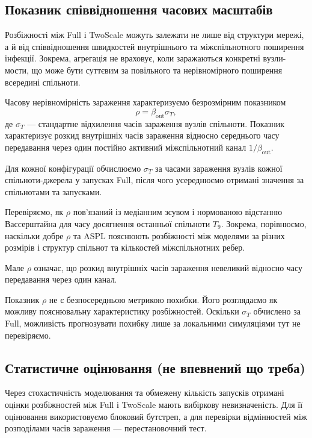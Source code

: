 \documentclass[a4paper,fleqn]{cas-sc}
\begin{document}
\subsection{Показник співвідношення часових масштабів}
\label{sec:descriptor}

Розбіжності між Full і TwoScale можуть залежати
не лише від структури мережі, а й від співвідношення
швидкостей внутрішнього та міжспільнотного
поширення інфекції. Зокрема, агрегація
не враховує, коли заражаються конкретні
вузли-мости, що може бути суттєвим
за повільного та нерівномірного
поширення всередині спільноти.

Часову нерівномірність зараження характеризуємо
безрозмірним показником
\begin{equation}
\label{eq:rho}
\rho=\beta_{\mathrm{out}}\sigma_T,
\end{equation}
де $\sigma_T$ --- стандартне відхилення
часів зараження вузлів спільноти.
Показник характеризує розкид внутрішніх
часів зараження відносно середнього часу
передавання через один постійно активний
міжспільнотний канал $1/\beta_{\mathrm{out}}$.

Для кожної конфігурації обчислюємо
$\sigma_T$ за часами зараження вузлів
кожної спільноти-джерела у запусках Full,
після чого усереднюємо отримані значення
за спільнотами та запусками.

Перевіряємо, як $\rho$ пов'язаний
із медіанним зсувом і нормованою відстанню
Вассерштайна для часу досягнення останньої
спільноти $T_9$. Зокрема, порівнюємо,
наскільки добре $\rho$ та ASPL пояснюють
розбіжності між моделями за різних
розмірів і структур спільнот та кількостей
міжспільнотних ребер.

Мале $\rho$ означає, що розкид внутрішніх
часів зараження невеликий відносно часу
передавання через один канал.

Показник $\rho$ не є безпосередньою метрикою
похибки. Його розглядаємо як можливу
пояснювальну характеристику розбіжностей.
Оскільки $\sigma_T$ обчислено за Full,
можливість прогнозувати похибку лише
за локальними симуляціями тут не перевіряємо.




\subsection{Статистичне оцінювання (не впевнений що треба)}

Через стохастичність моделювання та обмежену
кількість запусків отримані оцінки розбіжностей
між Full і TwoScale мають вибіркову невизначеність.
Для її оцінювання використовуємо блоковий бутстреп,
а для перевірки відмінностей між розподілами
часів зараження --- перестановочний тест.
\end{document}
